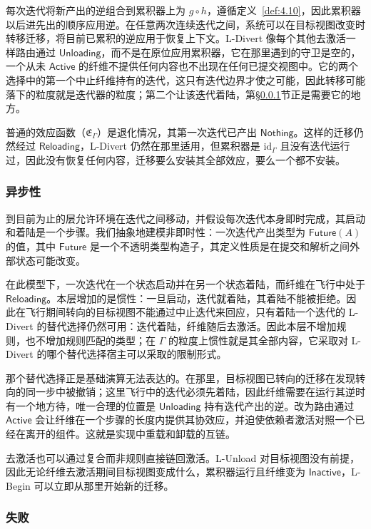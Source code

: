 每次迭代将新产出的逆组合到累积器上为 $g \circ h$，遵循定义~\ref{def:4.10}，因此累积器以后进先出的顺序应用逆。在任意两次连续迭代之间，系统可以在目标视图改变时转移迁移，将目前已累积的逆应用于恢复上下文。L-Divert 像每个其他去激活一样路由通过 $\mathsf{Unloading}$，而不是在原位应用累积器，它在那里遇到的守卫是空的，一个从未 $\mathsf{Active}$ 的纤维不提供任何内容也不出现在任何已提交视图中。它的两个选择中的第一个中止纤维持有的迭代，这只有迭代边界才使之可能，因此转移可能落下的粒度就是迭代器的粒度；第二个让该迭代着陆，第\S\ref{sec:4.3.3}节正是需要它的地方。

普通的效应函数（$\mathfrak{E}_\Gamma$）是退化情况，其第一次迭代已产出 $\mathsf{Nothing}$。这样的迁移仍然经过 $\mathsf{Reloading}$，L-Divert 仍然在那里适用，但累积器是 $\mathrm{id}_\Gamma$ 且没有迭代运行过，因此没有恢复任何内容，迁移要么安装其全部效应，要么一个都不安装。

\subsubsection{异步性}\label{sec:4.3.3}

到目前为止的层允许环境在迭代之间移动，并假设每次迭代本身即时完成，其启动和着陆是一个步骤。我们抽象地建模非即时性：一次迭代产出类型为 $\mathsf{Future}(A)$ 的值，其中 $\mathsf{Future}$ 是一个不透明类型构造子，其定义性质是在提交和解析之间外部状态可能改变。

在此模型下，一次迭代在一个状态启动并在另一个状态着陆，而纤维在飞行中处于 $\mathsf{Reloading}$。本层增加的是惯性：一旦启动，迭代就着陆，其着陆不能被拒绝。因此在飞行期间转向的目标视图不能通过中止迭代来回应，只有着陆一个迭代的 L-Divert 的替代选择仍然可用：迭代着陆，纤维随后去激活。因此本层不增加规则，也不增加规则匹配的类型；在 $\Gamma$ 的粒度上惯性就是其全部内容，它采取对 L-Divert 的哪个替代选择宿主可以采取的限制形式。

那个替代选择正是基础演算无法表达的。在那里，目标视图已转向的迁移在发现转向的同一步中被撤销；这里飞行中的迭代必须先着陆，因此纤维需要在运行其逆时有一个地方待，唯一合理的位置是 $\mathsf{Unloading}$ 持有迭代产出的逆。改为路由通过 $\mathsf{Active}$ 会让纤维在一个步骤的长度内提供其协效应，并迫使依赖者激活对照一个已经在离开的组件。这就是实现中重载和卸载的互链。

去激活也可以通过复合而非规则直接链回激活。L-Unload 对目标视图没有前提，因此无论纤维去激活期间目标视图变成什么，累积器运行且纤维变为 $\mathsf{Inactive}$，L-Begin 可以立即从那里开始新的迁移。

\subsubsection{失败}\label{sec:4.3.4}

